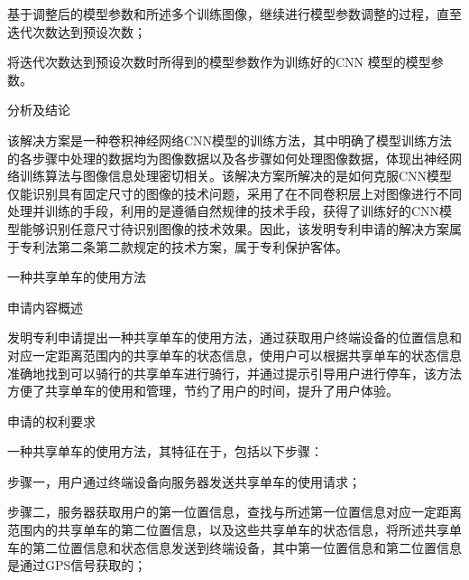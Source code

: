 {\setlength{\parindent}{20.6bp}基于调整后的模型参数和所述多个训练图像，继续进行模型参数调整的过程，直至迭代次数达到预设次数；\par}

{\setlength{\parindent}{20.6bp}将迭代次数达到预设次数时所得到的模型参数作为训练好的CNN 模型的模型参数。\par}

{\setlength{\parindent}{20.1bp}分析及结论\par}

{\setlength{\parindent}{20.6bp}该解决方案是一种卷积神经网络CNN模型的训练方法，其中明确了模型训练方法的各步骤中处理的数据均为图像数据以及各步骤如何处理图像数据，体现出神经网络训练算法与图像信息处理密切相关。该解决方案所解决的是如何克服CNN模型仅能识别具有固定尺寸的图像的技术问题，采用了在不同卷积层上对图像进行不同处理并训练的手段，利用的是遵循自然规律的技术手段，获得了训练好的CNN模型能够识别任意尺寸待识别图像的技术效果。因此，该发明专利申请的解决方案属于专利法第二条第二款规定的技术方案，属于专利保护客体。\par}

{\setlength{\parindent}{15.3bp}\par}

{\setlength{\parindent}{20.6bp}一种共享单车的使用方法\par}

{\setlength{\parindent}{20.1bp}申请内容概述\par}

{\setlength{\parindent}{20.6bp}发明专利申请提出一种共享单车的使用方法，通过获取用户终端设备的位置信息和对应一定距离范围内的共享单车的状态信息，使用户可以根据共享单车的状态信息准确地找到可以骑行的共享单车进行骑行，并通过提示引导用户进行停车，该方法方便了共享单车的使用和管理，节约了用户的时间，提升了用户体验。\par}

{\setlength{\parindent}{20.1bp}申请的权利要求\par}

{\setlength{\parindent}{20.6bp}一种共享单车的使用方法，其特征在于，包括以下步骤：\par}

{\setlength{\parindent}{20.6bp}步骤一，用户通过终端设备向服务器发送共享单车的使用请求；\par}

{\setlength{\parindent}{20.6bp}步骤二，服务器获取用户的第一位置信息，查找与所述第一位置信息对应一定距离范围内的共享单车的第二位置信息，以及这些共享单车的状态信息，将所述共享单车的第二位置信息和状态信息发送到终端设备，其中第一位置信息和第二位置信息是通过GPS信号获取的；\par}

